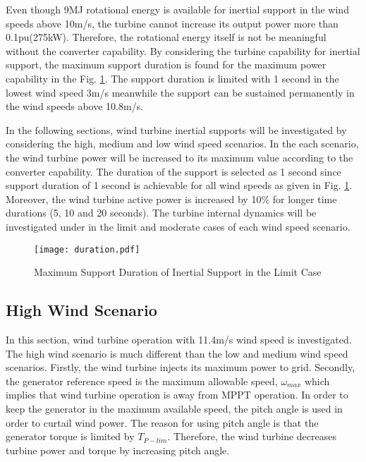 Even though 9MJ rotational energy is available for inertial support in the wind speeds above 10m/s, the turbine cannot increase its output power more than 0.1pu(275kW). Therefore, the rotational energy itself is not be meaningful without the converter capability. By considering the turbine capability for inertial support, the maximum support duration is found for the maximum power capability in the Fig. \ref{duration}. The support duration is limited with 1 second in the lowest wind speed 3m/s meanwhile the support can be sustained permanently in the wind speeds above 10.8m/s.\par 
In the following sections, wind turbine inertial supports will be investigated by considering the high, medium and low wind speed scenarios. In the each scenario, the wind turbine power will be increased to its maximum value according to the converter capability. The duration of the support is selected as 1 second since support duration of 1 second is achievable for all wind speeds as given in Fig. \ref{duration}. Moreover, the wind turbine active power is increased by 10\% for longer time durations (5, 10 and 20 seconds). The turbine internal dynamics will be investigated under in the limit and moderate cases of each wind speed scenario.
\begin{figure}[h!]
	\centering
	\texttt{[image: duration.pdf]}
	\caption{Maximum Support Duration of Inertial Support in the Limit Case}
	\label{duration}
\end{figure}
\subsection{High Wind Scenario}
In this section, wind turbine operation with 11.4m/s wind speed is investigated. The high wind scenario is much different than the low and medium wind speed scenarios. Firstly, the wind turbine injects its maximum power to grid. Secondly, the generator reference speed is the maximum allowable speed, $\omega_{max}$ which implies that wind turbine operation is away from MPPT operation. In order to keep the generator in the maximum available speed, the pitch angle is used in order to curtail wind power. The reason for using pitch angle is that the generator torque is limited by $T_{P-lim}$. Therefore, the wind turbine decreases turbine power and torque by increasing pitch angle.\par
